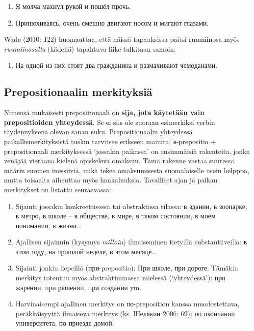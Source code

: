 \documentclass[]{scrartcl}
\providecommand{\tightlist}{%
  \setlength{\itemsep}{0pt}\setlength{\parskip}{0pt}}
\begin{document}
\begin{enumerate}
\def\labelenumi{(\arabic{enumi})}
\setcounter{enumi}{157}
\tightlist
\item
  Я молча махнул рукой и пошёл прочь.
\item
  Принюхиваясь, очень смешно двигают носом и мигают глазами.
\end{enumerate}

Wade (2010: 122) huomauttaa, että näissä tapauksissa paitsi ruumiinosa
myös \emph{ruumiinosalla} (kädellä) tapahtuva liike tulkitaan samoin:

\begin{enumerate}
\def\labelenumi{(\arabic{enumi})}
\setcounter{enumi}{159}
\tightlist
\item
  На одной из них стоят два гражданина и размахивают чемоданами.
\end{enumerate}

\subsection{Prepositionaalin
merkityksiä}\label{prepositionaalin-merkityksiuxe4}

Nimensä mukaisesti prepositionaali on \textbf{sija, jota käytetään vain
prepositioiden yhteydessä}. Se ei siis ole suoraan esimerkiksi verbin
täydennyksenä olevan sanan suku. Prepositionaalin yhteydessä
paikallismerkityksistä tuskin tarvitsee erikseen mainita: в-prepositio +
prepositionaali merkityksessä `jossakin paikassa' on ensimmäisiä
rakenteita, jonka venäjää vieraana kielenä opiskeleva omaksuu. Tämä
rakenne vastaa suuressa määrin suomen inessiiviä, mikä tekee
omaksumisesta suomalaiselle usein helppoa, mutta toisaalta aiheuttaa
myös hankaluuksia. Tavalliset ajan ja paikan merkitykset on listattu
seuraavassa:

\begin{enumerate}
\def\labelenumi{\arabic{enumi}.}
\tightlist
\item
  Sijainti jossakin konkreettisessa tai abstraktissa tilassa: в здании,
  в зоопарке, в метро, в школе -- в обществе, в мире, в таком состоянии,
  в моем понимании, в жизни\ldots{}
\item
  Ajallisen sijainnin (kysymys \emph{milloin}) ilmaiseminen tietyillä
  substantiiveilla: в этом году, на прошлой неделе, в этом
  месяце\ldots{}
\item
  Sijainti jonkin liepeillä (при-prepositio): При школе, при дороге.
  Tämäkin merkitys toteutuu myös abstraktimmassa mielessä
  (`yhteydessä'): при жарении, при решении, при создании ym.
\item
  Harvinaisempi ajallinen merkitys on по-preposition kanssa
  muodostettava, peräkkäisyyttä ilmaiseva merkitys (ks. Шелякин 2006:
  69): по окончании университета, по приезде домой.
\end{enumerate}
\end{document}
